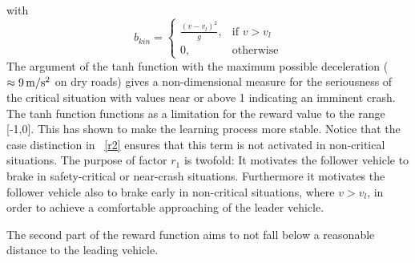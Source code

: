 \documentclass[review]{elsarticle}
\providecommand{\3}{{\ss}}
\begin{document}
with
\begin{equation}
\label{bkin}
b_{kin} = 
\begin{cases}
\frac{(v-v_l)^2}{g},& \text{if } v>v_l\\
0,              & \text{otherwise}
\end{cases}
\end{equation}
The argument of the tanh function with  the
maximum possible deceleration ($\approx \unit[9]{m/s^2}$ on dry roads) gives a
non-dimensional measure for the seriousness of the critical situation
with values 
near or above 1 indicating an imminent crash.  The tanh function functions as a limitation for the reward value to the range [-1,0]. This has shown to make the learning process more stable. Notice that the case distinction in ~\eqref{r2}  ensures that
this term is not activated in non-critical situations. The purpose of factor $r_1$ is twofold: It motivates the follower vehicle to brake in safety-critical or near-crash situations.  Furthermore it motivates the follower vehicle also to brake early in non-critical situations, where $ v>v_l$, in order to achieve a comfortable approaching of the leader vehicle.

The second part of the reward function aims to not fall below a reasonable
distance to the leading vehicle.
\end{document}
